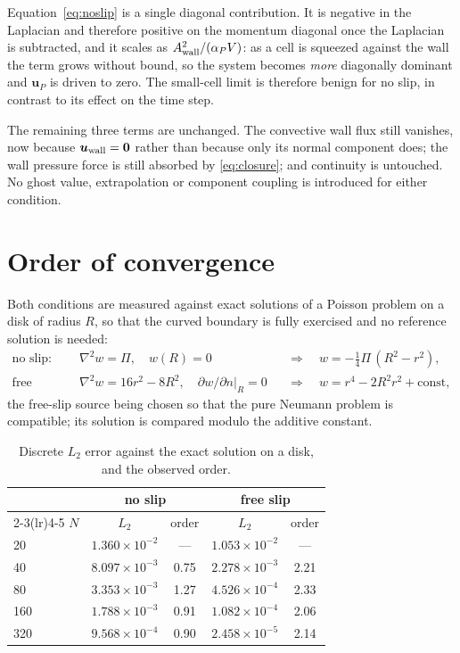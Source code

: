 \documentclass[11pt,a4paper]{article}
\theoremstyle{remark}
\newcommand{\uu}{\bm{u}}
\begin{document}
Equation~\eqref{eq:noslip} is a single diagonal contribution. It is negative in the Laplacian
and therefore positive on the momentum diagonal once the Laplacian is subtracted, and it
scales as $A_{\rm wall}^2/(\alpha_PV)$: as a cell is squeezed against the wall the term grows
without bound, so the system becomes \emph{more} diagonally dominant and $\uu_P$ is driven to
zero. The small-cell limit is therefore benign for no slip, in contrast to its effect on the
time step.

The remaining three terms are unchanged. The convective wall flux still vanishes, now because
$\uu_{\rm wall}=\bm 0$ rather than because only its normal component does; the wall pressure
force is still absorbed by \eqref{eq:closure}; and continuity is untouched. No ghost value,
extrapolation or component coupling is introduced for either condition.

\section{Order of convergence}\label{sec:order}

Both conditions are measured against exact solutions of a Poisson problem on a disk of radius
$R$, so that the curved boundary is fully exercised and no reference solution is needed:
\begin{align}
\text{no slip:}&\quad \nabla^2w=\Pi, \quad w(R)=0
&&\Rightarrow\quad w=-\tfrac14\Pi\,(R^2-r^2),\\
\text{free slip:}&\quad \nabla^2w=16r^2-8R^2, \quad \partial w/\partial n|_R=0
&&\Rightarrow\quad w=r^4-2R^2r^2+\text{const},
\end{align}
the free-slip source being chosen so that the pure Neumann problem is compatible; its solution
is compared modulo the additive constant.

\begin{table}[h]\centering
\caption{Discrete $L_2$ error against the exact solution on a disk, and the observed order.}
\label{tab:order}
\begin{tabular}{lcccc}
\toprule
& \multicolumn{2}{c}{no slip} & \multicolumn{2}{c}{free slip}\\
\cmidrule(lr){2-3}\cmidrule(lr){4-5}
$N$ & $L_2$ & order & $L_2$ & order\\
\midrule
20  & $1.360\times10^{-2}$ & ---  & $1.053\times10^{-2}$ & ---\\
40  & $8.097\times10^{-3}$ & 0.75 & $2.278\times10^{-3}$ & 2.21\\
80  & $3.353\times10^{-3}$ & 1.27 & $4.526\times10^{-4}$ & 2.33\\
160 & $1.788\times10^{-3}$ & 0.91 & $1.082\times10^{-4}$ & 2.06\\
320 & $9.568\times10^{-4}$ & 0.90 & $2.458\times10^{-5}$ & 2.14\\
\bottomrule
\end{tabular}
\end{table}
\end{document}
